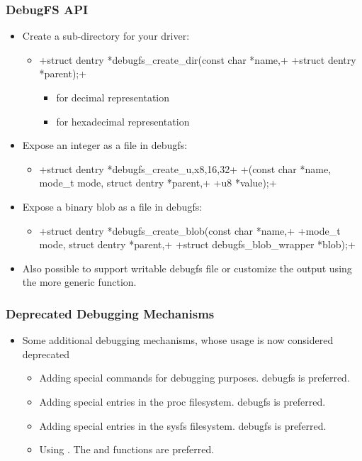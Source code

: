 \begin{frame}[fragile]
  \frametitle{DebugFS API}
  \begin{itemize}
  \item Create a sub-directory for your driver:
    \begin{itemize}
    \item {}+struct dentry *debugfs_create_dir(const char *name,+
      +struct dentry *parent);+
      \begin{itemize}
      \item {} for decimal representation
      \item {} for hexadecimal representation
      \end{itemize}
    \end{itemize}
  \item Expose an integer as a file in debugfs:
    \begin{itemize}
    \item {}+struct dentry *debugfs_create_{u,x}{8,16,32}+
      +(const char *name, mode_t mode, struct dentry *parent,+
      +u8 *value);+
    \end{itemize}
  \item Expose a binary blob as a file in debugfs:
    \begin{itemize}
    \item {}+struct dentry *debugfs_create_blob(const char *name,+
      +mode_t mode, struct dentry *parent,+
      +struct debugfs_blob_wrapper *blob);+
    \end{itemize}
  \item Also possible to support writable debugfs file or customize
    the output using the more generic 
    function.
  \end{itemize}
\end{frame}

\begin{frame}
  \frametitle{Deprecated Debugging Mechanisms}
  \begin{itemize}
  \item Some additional debugging mechanisms, whose usage is now
    considered deprecated
    \begin{itemize}
    \item Adding special  commands for debugging
      purposes. debugfs is preferred.
    \item Adding special entries in the proc filesystem. debugfs is
      preferred.
    \item Adding special entries in the sysfs filesystem. debugfs is
      preferred.
    \item Using . The  and 
      functions are preferred.
    \end{itemize}
  \end{itemize}
\end{frame}

